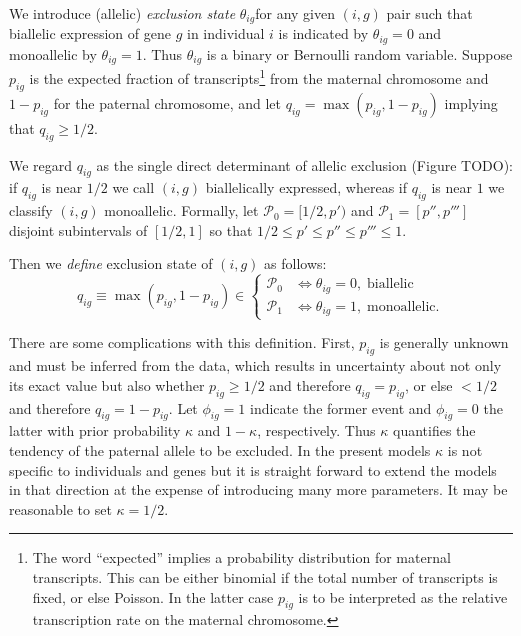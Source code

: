 \documentclass[letterpaper]{article}
\begin{document}
We introduce (allelic)
\emph{exclusion state} \(\theta_{ig}\)for any given \((i,g)\) pair such that
biallelic expression of gene \(g\) in individual \(i\) is indicated by
\(\theta_{ig}=0\) and monoallelic by \(\theta_{ig}=1\).  Thus \(\theta_{ig}\)
is a binary or Bernoulli random variable.
Suppose \(p_{ig}\) is the expected fraction of transcripts\footnote{The word
``expected'' implies a probability distribution for maternal transcripts.
This can be either binomial if the total number of transcripts is fixed, or
else Poisson.  In the latter case \(p_{ig}\) is to be interpreted as the
relative transcription rate on the maternal chromosome. } from the maternal
chromosome and \(1-p_{ig}\) for the paternal chromosome, and let
\(q_{ig}=\max(p_{ig},1-p_{ig})\) implying that \(q_{ig}\ge 1/2\).

We regard \(q_{ig}\) as the single direct determinant of
allelic exclusion (Figure TODO): if \(q_{ig}\) is near \(1/2\) we call \((i,g)\)
biallelically expressed, whereas if \(q_{ig}\) is near \(1\) we classify
\((i,g)\) monoallelic.  Formally, let \(\mathcal{P}_0 = [1/2, p')\) and
\(\mathcal{P}_1 = [p'', p''']\) disjoint subintervals of \([1/2,1]\) so that
\(1/2\le p'\le p''\le p'''\le 1\).

Then we \emph{define} exclusion state of \((i,g)\) as follows:
\begin{equation}
\label{eq:def-exclusion-state}
q_{ig} \equiv \max(p_{ig},1-p_{ig}) \in
\begin{cases}
\mathcal{P}_0 & \Leftrightarrow \theta_{ig}=0, \; \text{biallelic} \\
\mathcal{P}_1 & \Leftrightarrow \theta_{ig}=1, \; \text{monoallelic}.
\end{cases}
\end{equation}

There are some complications with this definition.  First, \(p_{ig}\) is
generally unknown and must be inferred from the data, which results in
uncertainty about not only its exact value but also whether
\(p_{ig}\ge 1/2\) and therefore \(q_{ig}=p_{ig}\), or else \(<1/2\) and therefore
\(q_{ig}=1-p_{ig}\).  Let \(\phi_{ig}=1\) indicate the former event and
\(\phi_{ig}=0\) the latter with prior probability \(\kappa\) and
\(1-\kappa\), respectively.  Thus \(\kappa\) quantifies the tendency of the
paternal allele to be excluded. In the present models \(\kappa\) is not
specific to individuals and genes but it is straight forward to extend the
models in that direction at the expense of introducing many more parameters.
It may be reasonable to set \(\kappa=1/2\).
\end{document}
